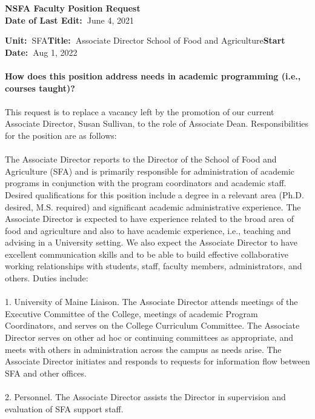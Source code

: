 \documentclass[11pt]{article}
\begin{document}
\sloppy \rmfamily
\begin{center}\textbf{NSFA Faculty Position Request\\Date of Last Edit:~}June 4, 2021\end{center}

\noindent\textbf{Unit:~}SFA\hfill\textbf{Title:~}Associate Director School of Food and Agriculture\hfill \textbf{Start Date:~}Aug 1, 2022\\~\\
\textbf{How does this position address needs in academic programming (i.e., courses taught)?}\\~\\
\small\sffamily 
This request is to replace a vacancy left by the promotion of our current Associate Director, Susan Sullivan, to the role of Associate Dean. Responsibilities for the position are as follows:   
\\~\\
The Associate Director reports to the Director of the School of Food and Agriculture (SFA) and is primarily responsible for administration of academic programs in conjunction with the program coordinators and academic staff.  Desired qualifications for this position include a degree in a relevant area (Ph.D. desired, M.S. required) and significant academic administrative experience.  The Associate Director is expected to have experience related to the broad area of food and agriculture and also to have academic experience, i.e., teaching and advising in a University setting.  We also expect the Associate Director to have excellent communication skills and to be able to build effective collaborative working relationships with students, staff, faculty members, administrators, and others.  Duties include:\\~\\
1. University of Maine Liaison.  The Associate Director attends meetings of the Executive Committee of the College, meetings of academic Program Coordinators, and serves on the College Curriculum Committee.  The Associate Director serves on other ad hoc or continuing committees as appropriate, and meets with others in administration across the campus as needs arise.  The Associate Director initiates and responds to requests for information flow between SFA and other offices.
\\~\\
2. Personnel.  The Associate Director assists the Director in supervision and evaluation of SFA support staff.
\\~\\
\end{document}
